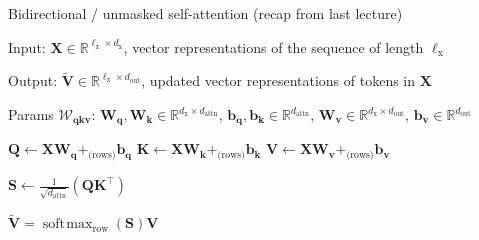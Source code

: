\documentclass[12pt,aspectratio=169,handout]{beamer}
\DeclareMathOperator*{\softmax}{soft\!\max}
\begin{document}
\begin{frame}{Bidirectional / unmasked self-attention (recap from last lecture)}
	
	\begin{minipage}[t][10cm][t]{15cm}
		
		Input: $\bm{X} \in \mathbb{R}^{\ell_{\text{x}} \times d_{\text{x}}}$, vector representations of the sequence of length $\ell_{\text{x}}$
		
		Output: $\bm{\tilde{V}} \in \mathbb{R}^{\ell_{\text{x}} \times d_{\text{out}}}$, updated vector representations of tokens in $\bm{X}$
		
		Params $\bm{\mathcal{W}_{qkv}}$: $\bm{W_q}, \bm{W_k} \in \mathbb{R}^{d_\text{x} \times d_\text{attn}}$, $\bm{b_q}, \bm{b_k} \in \mathbb{R}^{d_\text{attn}}$, $\bm{W_v} \in \mathbb{R}^{d_\text{x} \times d_\text{out}}$, $ \bm{b_v} \in \mathbb{R}^{d_\text{out}}$
		
		\begin{algorithmic}[1]
			\State $\bm{Q} \gets \bm{X} \bm{W_q} +_{\text{(rows)}} \bm{b_q}$
			\State $\bm{K} \gets \bm{X} \bm{W_k} +_{\text{(rows)}} \bm{b_k}$
			\State $\bm{V} \gets \bm{X} \bm{W_v} +_{\text{(rows)}} \bm{b_v}$
			
			\State $\bm{S} \gets \frac{1}{\sqrt{d_{\text{attn}}}} (\bm{Q} \bm{K}^\top)$
			
			\State \Return $\bm{\tilde V} = \softmax_{\text{row}}(\bm{S}) \bm{V}$
			
			\EndFunction
		\end{algorithmic}
		
	\end{minipage}
\end{frame}
\end{document}
